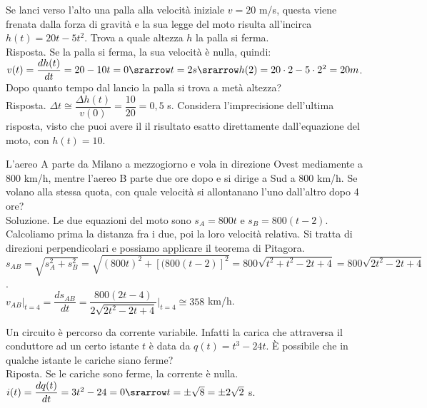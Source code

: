 \begin{esempio}
 Se lanci verso l'alto una palla alla velocità iniziale $v=20$ m/s, questa 
viene 
 frenata dalla forza di gravità e la sua legge del moto risulta all'incirca 
 $h(t)=20t-5t^2$. Trova a quale altezza $h$ la palla si ferma.\\
 Risposta. Se la palla si ferma, la sua velocità è nulla, quindi:\\
 $v(t)=\dfrac{dh(t)}{dt}= 20-10t=0\srarrow t=2 s \srarrow h(2)=20\cdot 
2-5\cdot 
 2^2=20 m$.\\
 Dopo quanto tempo dal lancio la palla si trova a metà altezza?\\
 Risposta. $\Delta t\cong \dfrac{\Delta h(t)}{v(0)}=\dfrac{10}{20}=0,5$ s.
 Considera l'imprecisione dell'ultima risposta, visto che puoi avere il
 il risultato esatto direttamente dall'equazione del moto, con $h(t)=10$.
\end{esempio}

\begin{esempio}
L'aereo A parte da Milano a mezzogiorno e vola in direzione Ovest 
mediamente a 
$800$ km/h, mentre l'aereo B parte due ore dopo e si dirige a Sud a $800$ 
km/h.
Se volano alla stessa quota, con quale velocità si allontanano l'uno 
dall'altro
dopo 4 ore?\\
Soluzione. Le due equazioni del moto sono $s_A=800t$ e $s_B=800(t-2)$. 
Calcoliamo prima la distanza fra i due, poi la loro velocità relativa.
Si tratta di direzioni perpendicolari e possiamo applicare il teorema di 
Pitagora.\\
$s_{AB}=\sqrt{s_A^2+s_B^2}=\sqrt{(800t)^2+[(800(t-2)]^2}=
800\sqrt{t^2+t^2-2t+4}=800\sqrt{2t^2-2t+4}$.\\
$v_{AB}|_{t=4}=\dfrac{ds_{AB}}{dt}=\dfrac{800(2t-4)}{2\sqrt{2t^2-2t+4}}
\bigg|_{t=4}\cong 358$ km/h.
\end{esempio}

\begin{esempio}
 Un circuito è percorso da corrente variabile. Infatti la carica che 
attraversa
il conduttore ad un certo istante $t$ è data da $q(t)=t^3-24t$. È possibile 
che in
qualche istante le cariche siano ferme?\\
Riposta. Se le cariche sono ferme, la corrente è nulla.\\ 
$i(t)=\dfrac{dq(t)}{dt}=3t^2-24=0\srarrow t=\pm\sqrt{8}=\pm2\sqrt{2}$ s.\\
\end{esempio}

